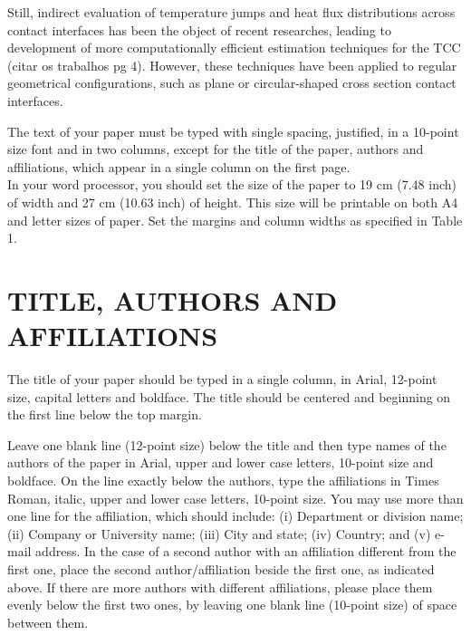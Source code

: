 \documentclass[conference,compsoc]{IEEEtran}
\begin{document}
Still, indirect evaluation of temperature jumps and heat flux distributions across contact interfaces has been the object of recent researches, leading to development of more computationally efficient estimation techniques for the TCC (citar os trabalhos pg 4). However, these techniques have been applied to regular geometrical configurations, such as plane or circular-shaped cross section contact interfaces. 



\newpage

The text of your paper must be typed with single spacing, justified, in a 10-point size font and in two columns, except for the title of the paper, authors and affiliations, which appear in a single column on the first page.\\

In your word processor, you should set the size of the paper to 19 cm (7.48 inch) of width and 27 cm (10.63 inch) of height. This size will be printable on both A4 and letter sizes of paper. Set the margins and column widths as specified in Table 1.



\section{TITLE, AUTHORS AND AFFILIATIONS}
The title of your paper should be typed in a single column, in Arial, 12-point size, capital letters and boldface. The title should be centered and beginning on the first line below the top margin.

Leave one blank line (12-point size) below the title and then type names of the authors of the paper in Arial, upper and lower case letters, 10-point size and boldface. On the line exactly below the authors, type the affiliations in Times Roman, italic, upper and lower case letters, 10-point size. You may use more than one line for the affiliation, which should include: (i) Department or division name; (ii) Company or University name; (iii) City and state; (iv) Country; and (v) e-mail address. In the case of a second author with an affiliation different from the first one, place the second author/affiliation beside the first one, as indicated above. If there are more authors with different affiliations, please place them evenly below the first two ones, by leaving one blank line (10-point size) of space between them.
\end{document}
